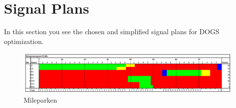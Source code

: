 \section{Signal Plans}
\label{app:signalplans}
In this section you see the chosen and simplified signal plans for DOGS optimization.

\begin{figure}[!ht]
\begin{center}
\includegraphics[scale=0.5]{sgp_mileparken.png} 
\end{center}
\caption{Mileparken}
\end{figure}